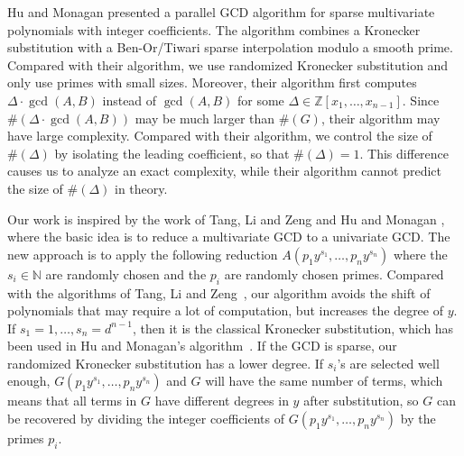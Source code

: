 \documentclass[final,20pt]{elsarticle}
\def\N{{\mathbb N}}
\def\Z{{\mathbb Z}}
\begin{document}
%
Hu and Monagan \cite{hu2021fast} presented a parallel GCD algorithm for sparse multivariate polynomials with
integer coefficients. The algorithm combines a Kronecker substitution with a Ben-Or/Tiwari sparse interpolation modulo a smooth prime.  Compared with their algorithm, we use randomized Kronecker substitution and only use primes with small sizes.
%
Moreover, their algorithm first computes $\Delta\cdot \gcd(A,B)$ instead of $\gcd(A,B)$ for some $\Delta\in\Z[x_1,\dots,x_{n-1}]$. Since $\#(\Delta\cdot \gcd(A,B))$ may be much larger than $\#(G)$, their algorithm may have large complexity.
%
Compared with their algorithm, we control the size of $\#(\Delta)$ by isolating the leading coefficient, so that $\#(\Delta)=1$. This difference causes us to analyze an exact complexity, while their algorithm cannot predict the size of $\#(\Delta)$ in theory.

Our work is inspired by the work of Tang, Li and Zeng \cite{tang2018computing} and Hu and Monagan \cite{hu2021fast}, where the basic idea is to reduce a multivariate GCD to a univariate GCD.
The new approach is to apply the following reduction $A(p_1y^{s_1},\dots,p_ny^{s_n})$ where the $s_i \in \N$ are randomly chosen and the $p_i$ are randomly chosen primes.
%
Compared with the algorithms of Tang, Li and Zeng~\cite{tang2018computing}, our algorithm avoids the shift of polynomials that may require a lot of computation, but increases the degree of $y$.
%
If $s_1=1,\dots,s_n=d^{n-1}$, then it is the classical Kronecker substitution, which has been used in Hu and Monagan's algorithm~\cite{hu2021fast}. If the GCD is sparse, our randomized Kronecker substitution has a lower degree.
%
If $s_i$'s are selected well enough, $G(p_1y^{s_1},\dots,p_ny^{s_n})$ and $G$ will
have the same number of terms, which means that all terms in $G$ have different degrees in $y$ after substitution, so $G$ can be recovered by dividing the integer coefficients of $G(p_1y^{s_1},\dots,p_ny^{s_n})$ by the primes $p_i.$




\end{document}
